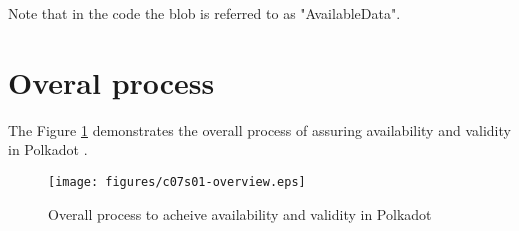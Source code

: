Note that in the code the blob is referred to as "AvailableData".

\section{Overal process}

The Figure \ref{diag-anv-overall} demonstrates the overall process of assuring
availability and validity in Polkadot .

\begin{figure}
  \centering
  \label{diag-anv-overall}
  \texttt{[image: figures/c07s01-overview.eps]}
  \caption{Overall process to acheive availability and validity in Polkadot}
\end{figure}

